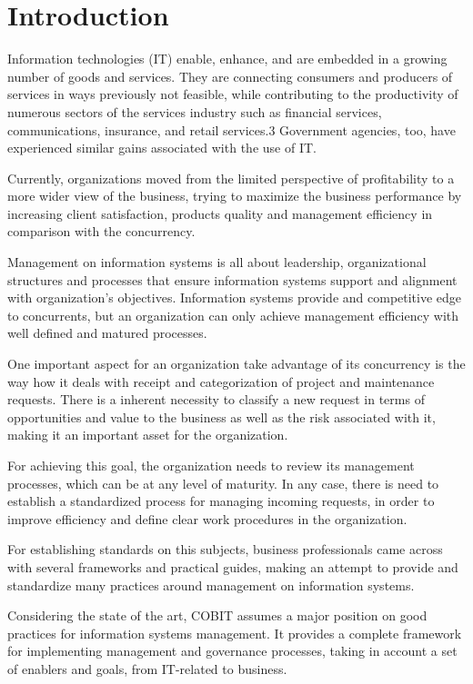 
% 
% 

\section{Introduction}

Information technologies (IT) enable, enhance, and are embedded in a growing number of goods and services. They are connecting consumers and producers of services in ways previously not feasible, while contributing to the productivity of numerous sectors of the services industry such as financial services, communications, insurance, and retail services.3 Government agencies, too, have experienced similar gains associated with the use of IT.\par
Currently, organizations moved from the limited perspective of profitability to a more wider view of the business, trying to maximize the business performance by increasing client satisfaction, products quality and management efficiency in comparison with the concurrency.\par
Management on information systems is all about leadership, organizational structures and processes that ensure information systems support and alignment with organization's objectives. Information systems provide and competitive edge to concurrents, but an organization can only achieve management efficiency with well defined and matured processes. \par
One important aspect for an organization take advantage of its concurrency is the way how it deals with receipt and categorization of project and maintenance requests. There is a inherent necessity to classify a new request in terms of opportunities  and value to the business as well as the risk associated with it, making it an important asset for the organization.\par
For achieving this goal, the organization needs to review its management processes, which can be at any level of maturity. In any case, there is need to establish a standardized process for managing incoming requests, in order to improve efficiency and define clear work procedures in the organization.\par
For establishing standards on this subjects, business professionals came across with several frameworks and practical guides, making an attempt to provide and standardize many practices around management on information systems.\par
Considering the state of the art, COBIT assumes a major position on good practices for information systems management. It provides a complete framework for implementing management and governance processes, taking in account a set of enablers and goals, from IT-related to business.\par

